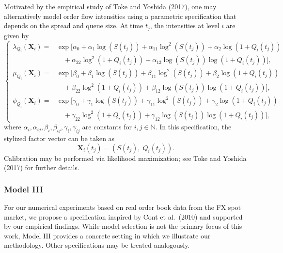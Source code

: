 \documentclass[11pt]{article}
\begin{document}
Motivated by the empirical study of Toke and Yoshida (2017), one may alternatively model order flow intensities using a parametric specification that depends on the spread and queue size. At time $t_j$, the intensities at level $i$ are given by
\begin{equation} \left\{ \begin{array}{ll} \lambda_{Q_i}(\boldsymbol{X}_i) = & \exp\bigg[\alpha_0 + \alpha_1 \log(S(t_j)) + \alpha_{11} \log^2(S(t_j)) + \alpha_2 \log(1+Q_i(t_j)) \\ &\quad + \alpha_{22} \log^2(1+Q_i(t_j)) + \alpha_{12} \log(S(t_j)) \log(1+Q_i(t_j))\bigg], \\[10pt] \mu_{Q_i}(\boldsymbol{X}_i) = & \exp\bigg[\beta_0 + \beta_1 \log(S(t_j)) + \beta_{11} \log^2(S(t_j)) + \beta_2 \log(1+Q_i(t_j)) \\ &\quad + \beta_{22} \log^2(1+Q_i(t_j)) + \beta_{12} \log(S(t_j)) \log(1+Q_i(t_j))\bigg], \\[10pt] \phi_{Q_i}(\boldsymbol{X}_i) = & \exp\bigg[\gamma_0 + \gamma_1 \log(S(t_j)) + \gamma_{11} \log^2(S(t_j)) + \gamma_2 \log(1+Q_i(t_j)) \\ &\quad + \gamma_{22} \log^2(1+Q_i(t_j)) + \gamma_{12} \log(S(t_j)) \log(1+Q_i(t_j))\bigg], \end{array} \right. \end{equation}
where $\alpha_i,\alpha_{ij},\beta_i,\beta_{ij},\gamma_i,\gamma_{ij}$ are constants for $i,j\in\mathbb{N}$. In this specification, the stylized factor vector can be taken as
\[
\boldsymbol{X}_i(t_j)=(S(t_j),\; Q_i(t_j)).
\]
Calibration may be performed via likelihood maximization; see Toke and Yoshida (2017) for further details.

\subsubsection{Model III}

For our numerical experiments based on real order book data from the FX spot market, we propose a specification inspired by Cont et al.~(2010) and supported by our empirical findings. While model selection is not the primary focus of this work, Model III provides a concrete setting in which we illustrate our methodology. Other specifications may be treated analogously.
\end{document}
